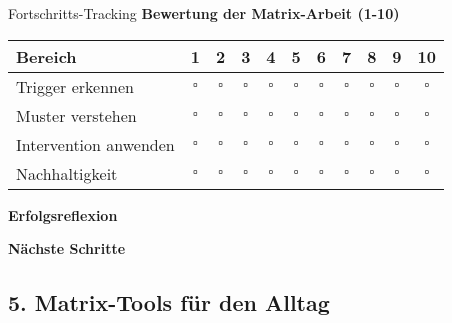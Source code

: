 \begin{ctmmOrangeBox}{Fortschritts-Tracking}
\textbf{Bewertung der Matrix-Arbeit (1-10)}\\

\begin{tabular}{|p{5cm}|c|c|c|c|c|c|c|c|c|c|}
\hline
\textbf{Bereich} & \textbf{1} & \textbf{2} & \textbf{3} & \textbf{4} & \textbf{5} & \textbf{6} & \textbf{7} & \textbf{8} & \textbf{9} & \textbf{10} \\
\hline
Trigger erkennen & $\square$ & $\square$ & $\square$ & $\square$ & $\square$ & $\square$ & $\square$ & $\square$ & $\square$ & $\square$ \\
\hline
Muster verstehen & $\square$ & $\square$ & $\square$ & $\square$ & $\square$ & $\square$ & $\square$ & $\square$ & $\square$ & $\square$ \\
\hline
Intervention anwenden & $\square$ & $\square$ & $\square$ & $\square$ & $\square$ & $\square$ & $\square$ & $\square$ & $\square$ & $\square$ \\
\hline
Nachhaltigkeit & $\square$ & $\square$ & $\square$ & $\square$ & $\square$ & $\square$ & $\square$ & $\square$ & $\square$ & $\square$ \\
\hline
\end{tabular}

\vspace{0.5cm}
\textbf{Erfolgsreflexion}\\

\vspace{0.5cm}
\textbf{Nächste Schritte}\\
\end{ctmmOrangeBox}

\subsection*{\textcolor{ctmmPurple}{5. Matrix-Tools für den Alltag}}

